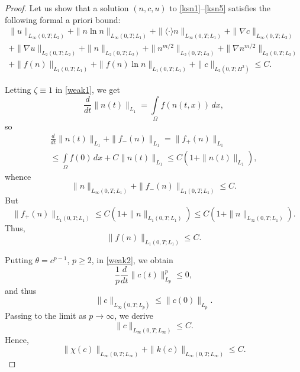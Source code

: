 \documentclass[10pt]{amsart}
\begin{document}
\begin{proof} Let us show that a solution $(n,c,u)$ to \eqref{ksn1}--\eqref{ksn5} satisfies the following formal a priori bound:
\begin{multline} \label{bound1} \|u\|_{L_{\infty}(0, T; L_{2})} +  \|n\ln n\|_{L_{\infty}(0, T; L_{1})} +\| \langle\cdot\rangle n\|_{L_{\infty}(0, T; L_{1})} + \|\nabla c\|_{L_{\infty}(0, T; L_{2})} \\
+
\| \nabla u\|_{L_{2}(0, T; L_{2})} + \|n\|_{L_{2}(0, T; L_{2})}+ \|n^{m/2}\|_{L_{2}(0, T; L_{2})}+ \|\nabla n^{m/2}\|_{L_{2}(0, T; L_{2})} \\ +\|f(n)\|_{L_{1}(0, T; L_{1})}+\|f(n)\ln n\|_{L_{1}(0, T; L_{1})}+ \|
c\|_{L_{2}(0, T; H^{2})}  \le C.  \end{multline}

Letting $\zeta\equiv 1$ in \eqref{weak1}, we get 
\begin{equation}\label{weakl1} \frac d {dt} \|n(t)\|_{L_{1}} = \int\limits_{\Omega} f(n(t,x)) \, dx,\end{equation} so \begin{multline}\label{boun1}\frac d {dt} \|n(t)\|_{L_{1}} +\|f_-(n)\|_{L_{1}} = \|f_+(n)\|_{L_{1}} \\ \leq \int\limits_{\Omega} f(0) \, dx +  C \|n(t)\|_{L_{1}} \leq C(1+ \|n(t)\|_{L_{1}}), \end{multline} whence 
\begin{equation} \label{bound2} \|n\|_{L_{\infty}(0, T; L_{1})} + \|f_{-}(n)\|_{L_{1}(0, T; L_{1})} \leq C. \end{equation}
But \begin{equation} \|f_{+}(n)\|_{L_{1}(0, T; L_{1})} \leq C(1+ \|n\|_{L_{1}(0, T; L_{1})}) \leq C(1+ \|n\|_{L_{\infty}(0, T; L_{1})}). \end{equation}
Thus,
\begin{equation}\label{bound21} \|f(n)\|_{L_{1}(0, T; L_{1})} \leq C. \end{equation}

Putting $\theta=c^{p-1}$, $p\geq 2$, in \eqref{weak2}, we obtain $$\frac 1 p \frac d {dt} \|c(t)\|_{L_{p}}^p\leq 0,$$ and thus \begin{equation} \label{bound3} \|c\|_{L_{\infty}(0, T; L_{p})} \leq  \|c(0)\|_{L_{p}}.\end{equation}   
Passing to the limit as $p\to\infty$, we derive \begin{equation} \label{bound4} \|c\|_{L_{\infty}(0, T; L_{\infty})} \leq  C.\end{equation} Hence, 
\begin{equation} \label{bound5} \|\chi(c)\|_{L_{\infty}(0, T; L_{\infty})}+\|k(c)\|_{L_{\infty}(0, T; L_{\infty})} \leq  C.\end{equation}


\end{proof}
\end{document}
